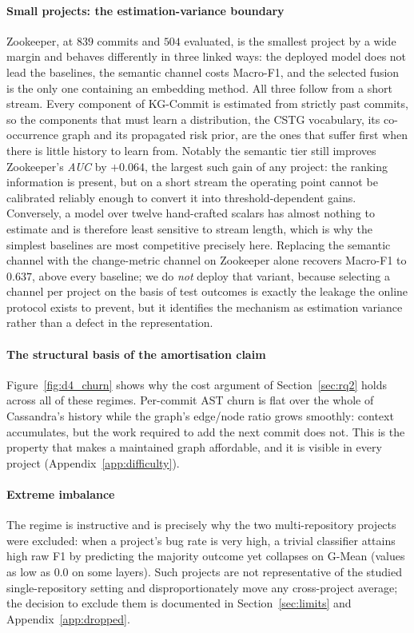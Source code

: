 \documentclass[final,5p,times,twocolumn]{elsarticle}
\theoremstyle{plain}
\begin{document}
\paragraph{Small projects: the estimation-variance boundary}
Zookeeper, at $839$ commits and $504$ evaluated, is the smallest project by a wide
margin and behaves differently in three linked ways: the deployed model does not lead
the baselines, the semantic channel costs Macro-F1, and the selected fusion is the only
one containing an embedding method. All three follow from a short stream. Every
component of KG-Commit is estimated from strictly past commits, so the components that
must learn a distribution, the CSTG vocabulary, its co-occurrence graph and its
propagated risk prior, are the ones that suffer first when there is little history to
learn from. Notably the semantic tier still improves Zookeeper's \emph{AUC} by
$+0.064$, the largest such gain of any project: the ranking information is present, but
on a short stream the operating point cannot be calibrated reliably enough to convert it
into threshold-dependent gains. Conversely, a model over twelve hand-crafted scalars has
almost nothing to estimate and is therefore least sensitive to stream length, which is
why the simplest baselines are most competitive precisely here. Replacing the semantic
channel with the change-metric channel on Zookeeper alone recovers Macro-F1 to $0.637$,
above every baseline; we do \emph{not} deploy that variant, because selecting a channel
per project on the basis of test outcomes is exactly the leakage the online protocol
exists to prevent, but it identifies the mechanism as estimation variance rather than a
defect in the representation.

\paragraph{The structural basis of the amortisation claim}
Figure~\ref{fig:d4_churn} shows why the cost argument of Section~\ref{sec:rq2} holds
across all of these regimes. Per-commit AST churn is flat over the whole of Cassandra's
history while the graph's edge/node ratio grows smoothly: context accumulates, but the
work required to add the next commit does not. This is the property that makes a
maintained graph affordable, and it is visible in every project
(Appendix~\ref{app:difficulty}).

\paragraph{Extreme imbalance} The regime is instructive and is precisely why the two
multi-repository projects were excluded: when a project's bug rate is very high, a
trivial classifier attains high raw F1 by predicting the majority outcome yet collapses
on G-Mean (values as low as $0.0$ on some layers). Such projects are not representative
of the studied single-repository setting and disproportionately move any cross-project
average; the decision to exclude them is documented in Section~\ref{sec:limits} and
Appendix~\ref{app:dropped}.
\end{document}
